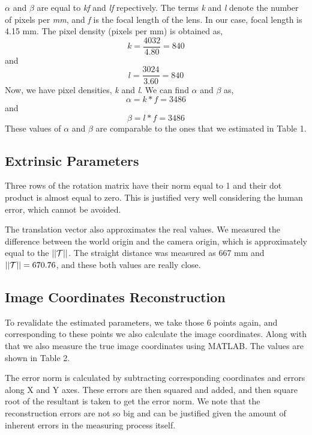 \documentclass{article}
\begin{document}
$\alpha$ and $\beta$ are equal to \textit{kf} and \textit{lf} repectively. The terms \textit{k} and \textit{l} denote the number of pixels per \textit{mm}, and \textit{f} is the focal length of the lens. 
In our case, focal length is 4.15 mm. The pixel density (pixels per mm) is obtained as,
\begin{equation}
k = \frac{4032}{4.80} = 840
\end{equation}
and
\begin{equation}
l = \frac{3024}{3.60} = 840
\end{equation}
\medskip
Now, we have pixel densities, \textit{k} and \textit{l}. We can find $\alpha$ and $\beta$ as, 
\begin{equation}
\alpha = k*f = 3486
\end{equation}
and
\begin{equation}
\beta = l*f = 3486
\end{equation}
These values of $\alpha$ and $\beta$ are comparable to the ones that we estimated in Table 1. 
\subsection{Extrinsic Parameters}
Three rows of the rotation matrix have their norm equal to 1 and their dot product is almost equal to zero. This is justified very well considering the human error, which cannot be avoided.

\medskip

The translation vector also approximates the real values. We measured the difference between the world origin and the camera origin, which is approximately equal to the $||\CMcal{T}||$. The straight distance was measured as 667 mm and $||\CMcal{T}|| = 670.76$, and these both values are really close. 

\subsection{Image Coordinates Reconstruction}
To revalidate the estimated parameters, we take those 6 points again, and corresponding to these points we also calculate the image coordinates. Along with that we also measure the true image coordinates using MATLAB. The values are shown in Table 2. 

\medskip

The error norm is calculated by subtracting corresponding coordinates and errors along X and Y axes. These errors are then squared and added, and then square root of the resultant is taken to get the error norm. We note that the reconstruction errors are not so big and can be justified given the amount of inherent errors in the measuring process itself.
\end{document}
